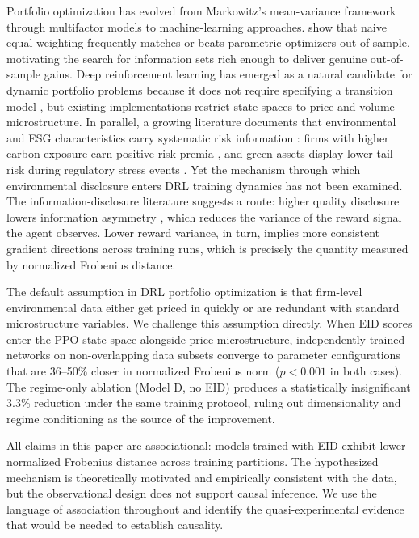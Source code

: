 \documentclass[12pt]{article}
\begin{document}
Portfolio optimization has evolved from Markowitz's
\citeyearpar{markowitz1952portfolio} mean-variance framework through
multifactor models \citep{famafrench1993common} to machine-learning
approaches. \citet{demiguel2009optimal} show that naive equal-weighting
frequently matches or beats parametric optimizers out-of-sample,
motivating the search for information sets rich enough to deliver
genuine out-of-sample gains. Deep reinforcement learning has emerged
as a natural candidate for dynamic portfolio problems because it does
not require specifying a transition model \citep{deng2017deep,zhang2020},
but existing implementations restrict state spaces to price and volume
microstructure. In parallel, a growing literature documents that
environmental and ESG characteristics carry systematic risk information
\citep{renneboog2008socially,friede2015,bolton2021carbon}: firms with
higher carbon exposure earn positive risk premia \citep{hong2019climate},
and green assets display lower tail risk during regulatory stress events
\citep{pastor2021,pedersen2021}. Yet the mechanism through which
environmental disclosure enters DRL training dynamics has not been
examined. The information-disclosure literature suggests a route: higher
quality disclosure lowers information asymmetry
\citep{verrecchia2001essays,lambert2007accounting}, which reduces the
variance of the reward signal the agent observes. Lower reward variance,
in turn, implies more consistent gradient directions across training
runs, which is precisely the quantity measured by normalized Frobenius distance.

The default assumption in DRL portfolio optimization
\citep{schulman2017proximal,mnih2015} is that firm-level environmental
data either get priced in quickly or are redundant with standard
microstructure variables. We challenge this assumption directly. When
EID scores enter the PPO state space alongside price microstructure,
independently trained networks on non-overlapping data subsets converge
to parameter configurations that are 36--50\% closer in normalized
Frobenius norm ($p<0.001$ in both cases). The regime-only ablation
(Model D, no EID) produces a statistically insignificant 3.3\%
reduction under the same training protocol, ruling out dimensionality
and regime conditioning as the source of the improvement.

All claims in this paper are associational: models trained with EID exhibit lower normalized Frobenius distance across training partitions. The hypothesized mechanism is theoretically motivated and empirically consistent with the data, but the observational design does not support causal inference. We use the language of association throughout and identify the quasi-experimental evidence that would be needed to establish causality.
\end{document}
